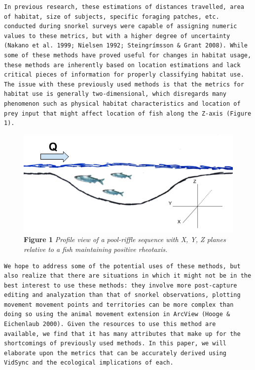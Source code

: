 \documentclass[]{article}
\begin{document}
\begin{verbatim}
In previous research, these estimations of distances travelled, area of habitat, size of subjects, specific foraging patches, etc. conducted during snorkel surveys were capable of assigning numeric values to these metrics, but with a higher degree of uncertainty (Nakano et al. 1999; Nielsen 1992; Steingrímsson & Grant 2008). While some of these methods have proved useful for changes in habitat usage, these methods are inherently based on location estimations and lack critical pieces of information for properly classifying habitat use. The issue with these previously used methods is that the metrics for habitat use is generally two-dimensional, which disregards many phenomenon such as physical habitat characteristics and location of prey input that might affect location of fish along the Z-axis (Figure 1).
\end{verbatim}

\begin{figure}
\centering
\includegraphics{XYZPlanes.png}
\caption{\textbf{Figure 1} \emph{Profile view of a pool-riffle sequence
with X, Y, Z planes relative to a fish maintaining positive rheotaxis.}}
\end{figure}

\begin{verbatim}
We hope to address some of the potential uses of these methods, but also realize that there are situations in which it might not be in the best interest to use these methods: they involve more post-capture editing and analyzation than that of snorkel observations, plotting movement movement points and territories can be more complex than doing so using the animal movement extension in ArcView (Hooge & Eichenlaub 2000). Given the resources to use this method are available, we find that it has many attributes that make up for the shortcomings of previously used methods. In this paper, we will elaborate upon the metrics that can be accurately derived using VidSync and the ecological implications of each. 
\end{verbatim}
\end{document}
